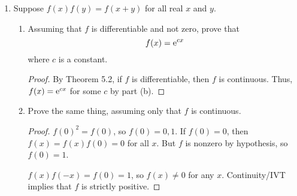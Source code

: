 \documentclass[../psets.tex]{subfiles}
\begin{document}
\begin{enumerate}[label={\textbf{\arabic*.}}]
\begin{proof}
\begin{equation*}
\begin{cases}
                0 & x=0\\
                \sum_{i=1}^ma_ix^{-b_i}\e[-1/x^2] & x\neq 0
            \end{cases}
        \end{equation*}
        Then
        \begin{align*}
            f^{(n)}(0) &= \lim_{h\to 0}\frac{f^{(n-1)}(h)-f^{(n-1)}(0)}{h}\\
            &= \lim_{h\to 0}\frac{\sum_{i=1}^ma_ih^{-b_i}\e[-1/h^2]}{h}\\
            &= \sum_{i=1}^ma_i\lim_{h\to 0}h^{-b_i-1}\e[-1/h^2]\\
            &= \sum_{i=1}^ma_i\cdot 0\tag*{Theorem 8.6e}\\
            &= 0
        \end{align*}
        Furthermore, we can calculate by the rules of derivatives that if $x\neq 0$, then
        \begin{equation*}
            f^{(n)}(x) = \sum_{i=1}^ma_i\left[ -b_ix^{-b_i-1}\e[-1/x^2]+2x^{-b_i-3}\e[-1/x^2] \right]
        \end{equation*}
        which is of the form $\sum_{i=1}^ma_ix^{-b_i}\e[-1/x^2]$, as desired.
    \end{proof}
    \setcounter{enumi}{5}
    \item Suppose $f(x)f(y)=f(x+y)$ for all real $x$ and $y$.
    \begin{enumerate}
        \item Assuming that $f$ is differentiable and not zero, prove that
        \begin{equation*}
            f(x) = \e[cx]
        \end{equation*}
        where $c$ is a constant.
        \begin{proof}
            By Theorem 5.2, if $f$ is differentiable, then $f$ is continuous. Thus, $f(x)=\e[cx]$ for some $c$ by part (b).
        \end{proof}
        \item Prove the same thing, assuming only that $f$ is continuous.
        \begin{proof}
            $f(0)^2=f(0)$, so $f(0)=0,1$. If $f(0)=0$, then $f(x)=f(x)f(0)=0$ for all $x$. But $f$ is nonzero by hypothesis, so $f(0)=1$.

            $f(x)f(-x)=f(0)=1$, so $f(x)\neq 0$ for any $x$. Continuity/IVT implies that $f$ is strictly positive.


\end{proof}
\end{enumerate}
\end{enumerate}
\end{document}

